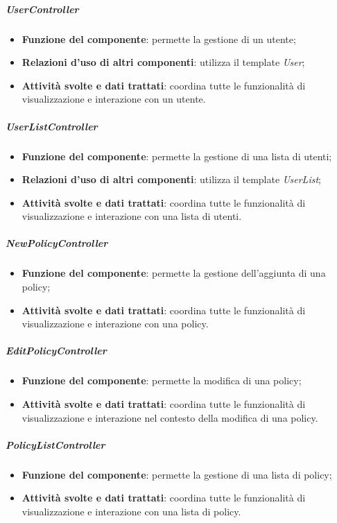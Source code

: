 \subparagraph{UserController}
\begin{itemize}
	\item \textbf{Funzione del componente}: permette la gestione di un utente;
	\item \textbf{Relazioni d’uso di altri componenti}: utilizza il template \textit{User};
	\item \textbf{Attività svolte e dati trattati}: coordina tutte le funzionalità di visualizzazione e interazione con un utente.
\end{itemize}

\subparagraph{UserListController}
\begin{itemize}
	\item \textbf{Funzione del componente}: permette la gestione di una lista di utenti;
	\item \textbf{Relazioni d’uso di altri componenti}: utilizza il template \textit{UserList};
	\item \textbf{Attività svolte e dati trattati}: coordina tutte le funzionalità di visualizzazione e interazione con una lista di utenti.
\end{itemize}

\subparagraph{NewPolicyController}
\begin{itemize}
	\item \textbf{Funzione del componente}: permette la gestione dell'aggiunta di una policy;
	\item \textbf{Attività svolte e dati trattati}: coordina tutte le funzionalità di visualizzazione e interazione con una policy.
\end{itemize}

\subparagraph{EditPolicyController}
\begin{itemize}
	\item \textbf{Funzione del componente}: permette la modifica di una policy;
	\item \textbf{Attività svolte e dati trattati}: coordina tutte le funzionalità di visualizzazione e interazione nel contesto della modifica di una policy.
\end{itemize}

\subparagraph{PolicyListController}
\begin{itemize}
	\item \textbf{Funzione del componente}: permette la gestione di una lista di policy;
	\item \textbf{Attività svolte e dati trattati}: coordina tutte le funzionalità di visualizzazione e interazione con una lista di policy.
\end{itemize}


